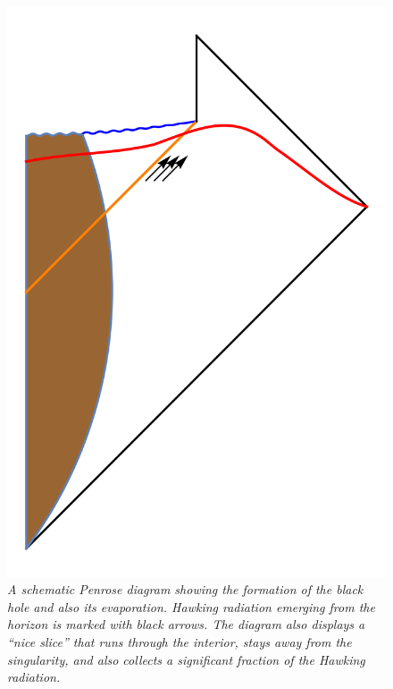 \documentclass[12pt]{article}
\begin{document}
\begin{figure}[!ht]
\begin{center}
\includegraphics[height=0.4\textheight]{backreactpenrose.png}
\caption{\em A schematic Penrose diagram showing the formation of the black hole
and also its evaporation. Hawking radiation emerging from the horizon is marked with black arrows. The diagram also displays a ``nice slice'' that runs through the interior, stays away from the singularity, and also collects a significant fraction of the Hawking radiation.\label{backreactpenrose}}
\end{center}
\end{figure}
\end{document}
